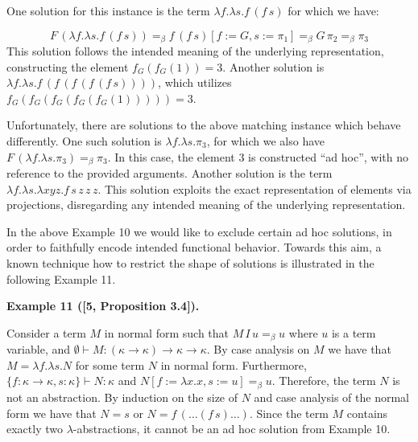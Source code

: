  
 
One solution for this instance is the term $\lambda f.\lambda s.f\,(f\,s)$ for which we have:\par
    \[F\,(\lambda f.\lambda s.f\,(f\,s))=_{\beta}f\,(f\,s)[f:=G,s:=\pi_{1}]=_{\beta}%
G\,\pi_{2}=_{\beta}\pi_{3}\]    
This solution follows the intended meaning of the underlying representation, constructing the element $f_{G}(f_{G}(1))=3$. Another solution is $\lambda f.\lambda s.f\,(f\,(f\,(f\,(f\,s))))$, which utilizes $f_{G}(f_{G}(f_{G}(f_{G}(f_{G}(1)))))=3$.\par
 
 
 
Unfortunately, there are solutions to the above matching instance which behave differently. One such solution is $\lambda f.\lambda s.\pi_{3}$, for which we also have $F\,(\lambda f.\lambda s.\pi_{3})=_{\beta}\pi_{3}$. In this case, the element $3$ is constructed “ad hoc”, with no reference to the provided arguments. Another solution is the term $\lambda f.\lambda s.\lambda xyz.f\,s\,z\,z\,z$. This solution exploits the exact representation of elements via projections, disregarding any intended meaning of the underlying representation.\par
 
 
 
 
In the above Example 10 we would like to exclude certain ad hoc solutions, in order to faithfully encode intended functional behavior. Towards this aim, a known technique how to restrict the shape of solutions is illustrated in the following Example 11.\par
 
 
 
\par\medskip\noindent\textbf{Example 11 ([5, Proposition 3.4]).}\par
 
 
Consider a term $M$ in normal form such that $M\,I\,u=_{\beta}u$ where $u$ is a term variable, and $\emptyset\vdash M:(\kappa\to\kappa)\to\kappa\to\kappa$. By case analysis on $M$ we have that $M=\lambda f.\lambda s.N$ for some term $N$ in normal form. Furthermore, $\{f:\kappa\to\kappa,s:\kappa\}\vdash N:\kappa$ and $N[f:=\lambda x.x,s:=u]=_{\beta}u$. Therefore, the term $N$ is not an abstraction. By induction on the size of $N$ and case analysis of the normal form we have that $N=s$ or $N=f\,(\ldots(f\,s)\ldots)$. Since the term $M$ contains exactly two $\lambda$-abstractions, it cannot be an ad hoc solution from Example 10.\par
 
